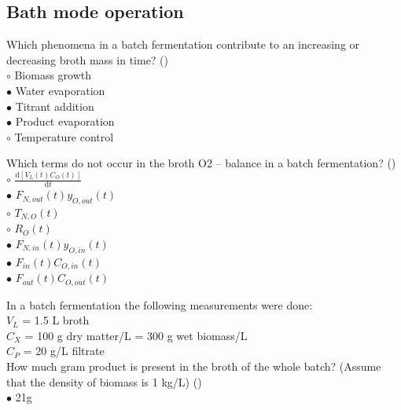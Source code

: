 \documentclass[]{beamer}
\begin{document}
\subsection{Bath mode operation}
\setcounter{questions}{0}
\begin{frame}[shrink] {}
\addtocounter{questions}{1}
\color{blue}
Which phenomena in a batch fermentation contribute to an increasing or decreasing broth mass in time? ()\\
\color{black}
\setlength{\parindent}{-0.4cm}
{\color{red}$\circ$}  Biomass growth \\
{\color{red}$\bullet$} Water evaporation \\
{\color{red}$\bullet$} Titrant addition \\
{\color{red}$\bullet$} Product evaporation \\
{\color{red}$\circ$} Temperature control  \\
\end{frame}

\begin{frame}[shrink] {}
\addtocounter{questions}{1}
\color{blue}
Which terms do not occur in the broth O2 – balance in a batch fermentation? ()\\
\color{black}
\setlength{\parindent}{-0.4cm}
{\color{red}$\circ$} $\frac{\mathrm d [V_{L}(t)C_O(t)]}{\mathrm dt}$ \\[0.3em]
{\color{red}$\bullet$} $F_{N,out}(t) y_{O,out}(t)$ \\
{\color{red}$\circ$} $T_{N,O} (t)$ \\
{\color{red}$\circ$} $R_O (t)$ \\
{\color{red}$\bullet$} $F_{N,in}(t) y_{O,in}(t)$ \\
{\color{red}$\bullet$} $F_{in}(t) C_{O,in}(t)$ \\
{\color{red}$\bullet$} $F_{out}(t) C_{O,out}(t)$ \\
\end{frame}

\begin{frame}[shrink] {}
\addtocounter{questions}{1}
\color{blue}
In a batch fermentation the following measurements were done: \\
\color{gray}
$V_L$ = 1.5 L broth  \\
$C_X$ = 100 g dry matter/L = 300 g wet biomass/L \\
$C_P$ = 20 g/L filtrate \\
\color{blue}
How much gram product is present in the broth of the whole batch? 
(Assume that the density of biomass is 1 kg/L) ()\\
\color{black}
{\color{red}$\bullet$} 21g \\
\end{frame}
\end{document}
